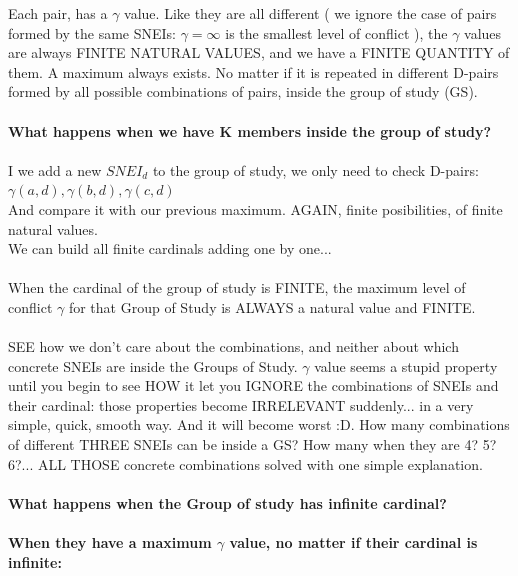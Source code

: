 		\noindent
		Each pair, has a $\gamma$ value. Like they are all different ( we ignore the case of pairs formed by the same SNEIs: $\gamma=\infty$ is the smallest level of conflict ), the $\gamma$ values are always FINITE NATURAL VALUES, and we have a FINITE QUANTITY of them. A maximum always exists. No matter if it is repeated in different D-pairs formed by all possible combinations of pairs, inside the group of study (GS).
		\\\\
		
		\noindent
		\textbf{What happens when we have K members inside the group of study?}
		\\\\
		
		\noindent
		I we add a new $SNEI_{d}$ to the group of study, we only need to check D-pairs:\\
		$\gamma(a,d), \gamma(b,d), \gamma(c,d)$\\
		And compare it with our previous maximum. AGAIN, finite posibilities, of finite natural values.\\
		We can build all finite cardinals adding one by one...
		\\\\
		
		\noindent
		When the cardinal of the group of study is FINITE, the maximum level of conflict $\gamma$ for that Group of Study is ALWAYS a natural value and FINITE.
		\\\\
		
		\noindent
		SEE how we don't care about the combinations, and neither about	which concrete SNEIs are inside the Groups of Study. $\gamma$ value seems a stupid property until you begin to see HOW it let you IGNORE the combinations of SNEIs and their cardinal: those properties become IRRELEVANT suddenly... in a very simple, quick, smooth way. And it will become worst :D. How many combinations of different THREE SNEIs can be inside a GS? How many when they are 4? 5? 6?... ALL THOSE concrete combinations solved with one simple explanation. 
		\\\\
		
		\noindent
		\textbf{What happens when the Group of study has infinite cardinal?}
		\\\\
		
		\noindent
		\textbf{When they have a maximum $\gamma$ value, no matter if their cardinal is infinite:}
		\\\\
		
